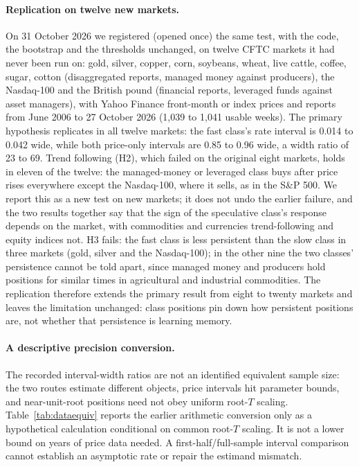 \documentclass[12pt]{article}
\theoremstyle{definition}
\theoremstyle{remark}
\begin{document}
\paragraph{Replication on twelve new markets.} On 31 October 2026 we registered (opened once) the same test, with the code, the bootstrap and the thresholds unchanged, on twelve CFTC markets it had never been run on: gold, silver, copper, corn, soybeans, wheat, live cattle, coffee, sugar, cotton (disaggregated reports, managed money against producers), the Nasdaq-100 and the British pound (financial reports, leveraged funds against asset managers), with Yahoo Finance front-month or index prices and reports from June 2006 to 27 October 2026 (1,039 to 1,041 usable weeks). The primary hypothesis replicates in all twelve markets: the fast class's rate interval is 0.014 to 0.042 wide, while both price-only intervals are 0.85 to 0.96 wide, a width ratio of 23 to 69. Trend following (H2), which failed on the original eight markets, holds in eleven of the twelve: the managed-money or leveraged class buys after price rises everywhere except the Nasdaq-100, where it sells, as in the S\&P 500. We report this as a new test on new markets; it does not undo the earlier failure, and the two results together say that the sign of the speculative class's response depends on the market, with commodities and currencies trend-following and equity indices not. H3 fails: the fast class is less persistent than the slow class in three markets (gold, silver and the Nasdaq-100); in the other nine the two classes' persistence cannot be told apart, since managed money and producers hold positions for similar times in agricultural and industrial commodities. The replication therefore extends the primary result from eight to twenty markets and leaves the limitation unchanged: class positions pin down how persistent positions are, not whether that persistence is learning memory.

\paragraph{A descriptive precision conversion.} The recorded interval-width ratios are not an identified equivalent sample size: the two routes estimate different objects, price intervals hit parameter bounds, and near-unit-root positions need not obey uniform root-$T$ scaling. Table~\ref{tab:dataequiv} reports the earlier arithmetic conversion only as a hypothetical calculation conditional on common root-$T$ scaling. It is not a lower bound on years of price data needed. A first-half/full-sample interval comparison cannot establish an asymptotic rate or repair the estimand mismatch.
\end{document}
